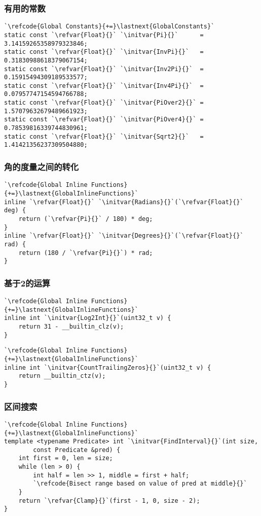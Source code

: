 \subsubsection*{有用的常数}
\begin{lstlisting}
`\refcode{Global Constants}{+=}\lastnext{GlobalConstants}`
static const `\refvar{Float}{}` `\initvar{Pi}{}`      = 3.14159265358979323846;
static const `\refvar{Float}{}` `\initvar{InvPi}{}`   = 0.31830988618379067154;
static const `\refvar{Float}{}` `\initvar{Inv2Pi}{}`  = 0.15915494309189533577;
static const `\refvar{Float}{}` `\initvar{Inv4Pi}{}`  = 0.07957747154594766788;
static const `\refvar{Float}{}` `\initvar{PiOver2}{}` = 1.57079632679489661923;
static const `\refvar{Float}{}` `\initvar{PiOver4}{}` = 0.78539816339744830961;
static const `\refvar{Float}{}` `\initvar{Sqrt2}{}`   = 1.41421356237309504880;
\end{lstlisting}

\subsubsection*{角的度量之间的转化}
\begin{lstlisting}
`\refcode{Global Inline Functions}{+=}\lastnext{GlobalInlineFunctions}`
inline `\refvar{Float}{}` `\initvar{Radians}{}`(`\refvar{Float}{}` deg) { 
    return (`\refvar{Pi}{}` / 180) * deg; 
}
inline `\refvar{Float}{}` `\initvar{Degrees}{}`(`\refvar{Float}{}` rad) { 
    return (180 / `\refvar{Pi}{}`) * rad; 
}
\end{lstlisting}

\subsubsection*{基于2的运算}
\begin{lstlisting}
`\refcode{Global Inline Functions}{+=}\lastnext{GlobalInlineFunctions}`
inline int `\initvar{Log2Int}{}`(uint32_t v) {
    return 31 - __builtin_clz(v);
}
\end{lstlisting}
\begin{lstlisting}
`\refcode{Global Inline Functions}{+=}\lastnext{GlobalInlineFunctions}`
inline int `\initvar{CountTrailingZeros}{}`(uint32_t v) {
    return __builtin_ctz(v);
}
\end{lstlisting}

\subsubsection*{区间搜索}
\begin{lstlisting}
`\refcode{Global Inline Functions}{+=}\lastnext{GlobalInlineFunctions}`
template <typename Predicate> int `\initvar{FindInterval}{}`(int size,
        const Predicate &pred) {
    int first = 0, len = size;
    while (len > 0) {
        int half = len >> 1, middle = first + half;
        `\refcode{Bisect range based on value of pred at middle}{}`
    }
    return `\refvar{Clamp}{}`(first - 1, 0, size - 2);
}
\end{lstlisting}

